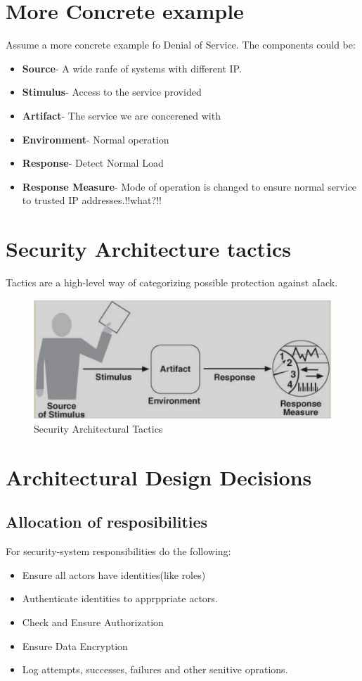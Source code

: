 \documentclass[a4paper]{report}
\begin{document}
\section{More Concrete example}
Assume a more concrete example fo Denial of Service. The components could be:
\begin{itemize}
\item \textbf{Source}- A wide ranfe of systems with different IP.
\item \textbf{Stimulus}- Access to the service provided
\item \textbf{Artifact}- The service we are concerened with
\item \textbf{Environment}- Normal operation
\item \textbf{Response}- Detect Normal Load
\item \textbf{Response Measure}- Mode of operation is changed to ensure normal service to trusted IP addresses.!!what?!!
\end{itemize}

\section{Security Architecture tactics}
Tactics are a high-level way of categorizing possible protection against aIack.
\begin{figure}[h]
\centering 
\includegraphics[scale=0.3]{aimages/genreralqascenario.png}
\caption{\label{tab:widgets}Security Architectural Tactics}
\end{figure}

\section{Architectural Design Decisions}
\subsection{Allocation of resposibilities}
For security-system responsibilities do the following:
\begin{itemize}
\item Ensure all actors have identities(like roles)
\item Authenticate identities to apprppriate actors.
\item Check and Ensure Authorization
\item Ensure Data Encryption
\item Log attempts, successes, failures and other senitive oprations.
\end{itemize}
\end{document}
